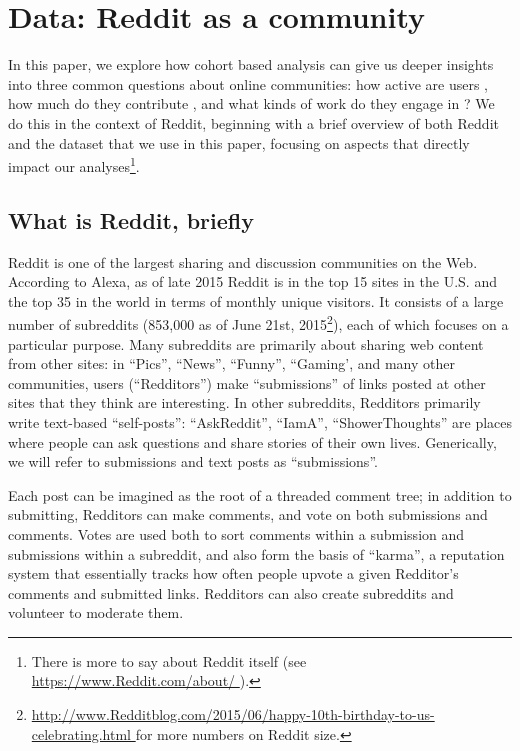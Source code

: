 \section{Data: Reddit as a community}

In this paper, we explore how cohort based analysis can give us deeper insights into three common questions about online communities: how active are users \cite{Scellato2011,Hughes2009,Java2007,Levy1984}, how much do they contribute \cite{Scellato2011,Gruhl2004,Guo2009}, and what kinds of work do they engage in \cite{Welser2011,Choi2010,Panciera2009}?  We do this in the context of Reddit, beginning with a brief overview of both Reddit and the dataset that we use in this paper, focusing on aspects that directly impact our analyses\footnote{There is more to say about Reddit itself (see \url{https://www.Reddit.com/about/ }).}.


\subsection{What is Reddit, briefly}

Reddit is one of the largest sharing and discussion communities on the Web.  According to Alexa, as of late 2015 Reddit is in the top 15 sites in the U.S. and the top 35 in the world in terms of monthly unique visitors.  It consists of a large number of subreddits (853,000 as of June 21st, 2015\footnote{\url{http://www.Redditblog.com/2015/06/happy-10th-birthday-to-us-celebrating.html }for more numbers on Reddit size.}), each of which focuses on a particular purpose.  Many subreddits are primarily about sharing web content from other sites: in ``Pics'', ``News'', ``Funny'', ``Gaming', and many other communities, users (``Redditors'') make ``submissions'' of links posted at other sites that they think are interesting.  In other subreddits, Redditors primarily write text-based ``self-posts'': ``AskReddit'', ``IamA'', ``ShowerThoughts'' are places where people can ask questions and share stories of their own lives.  Generically, we will refer to submissions and text posts as ``submissions''.  

Each post can be imagined as the root of a threaded comment tree; in addition to submitting, Redditors can make comments, and vote on both submissions and comments.  Votes are used both to sort comments within a submission and submissions within a subreddit, and also form the basis of ``karma'', a reputation system that essentially tracks how often people upvote a given Redditor's comments and submitted links.  Redditors can also create subreddits and volunteer to moderate them.

